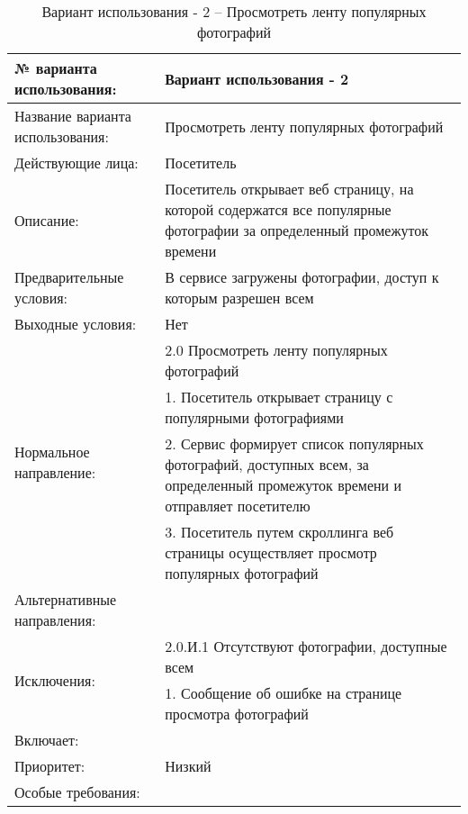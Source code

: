 \begin{table}[H]
  \caption{Вариант использования - 2 – Просмотреть ленту популярных фотографий}\label{use-case-2-table}
  \begin{tabular}{|p{6cm}|p{10cm}|}
  \hline № варианта использования: & Вариант использования - 2 \\
  \hline Название варианта использования: & Просмотреть ленту популярных фотографий \\
  \hline Действующие лица: & Посетитель \\
  \hline Описание: & Посетитель открывает веб страницу, на которой содержатся все популярные фотографии за определенный промежуток времени \\
  \hline Предварительные условия: & В сервисе загружены фотографии, доступ к которым разрешен всем \\
  \hline Выходные условия: & Нет \\
  \hline \multirow{4}{*}{Нормальное направление:} & 2.0 Просмотреть ленту популярных фотографий \\
  \cline{2-2} & 1. Посетитель открывает страницу с популярными фотографиями \\
  \cline{2-2} & 2. Сервис формирует список популярных фотографий, доступных всем, за определенный промежуток времени и отправляет посетителю \\
  \cline{2-2} & 3. Посетитель путем скроллинга веб страницы осуществляет просмотр популярных фотографий \\
  \hline Альтернативные направления: &  \\
  \hline \multirow{2}{*}{Исключения:} & 2.0.И.1 Отсутствуют фотографии, доступные всем \\
  \cline{2-2} & 1. Сообщение об ошибке на странице просмотра фотографий \\
  \hline Включает: &  \\
  \hline Приоритет: & Низкий \\
  \hline Особые требования: & \\
  \hline
  \end{tabular}
\end{table}

